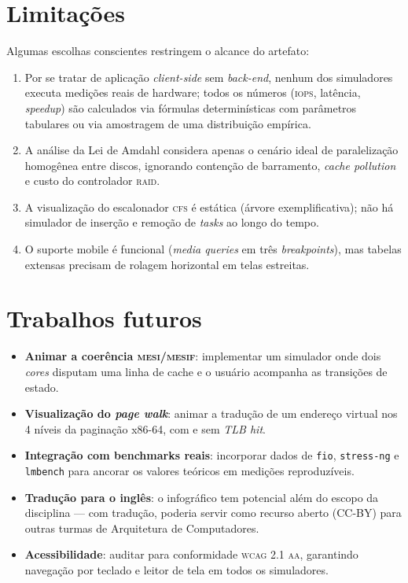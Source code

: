 \section{Limitações}

Algumas escolhas conscientes restringem o alcance do artefato:

\begin{enumerate}
    \item Por se tratar de aplicação \emph{client-side} sem
          \emph{back-end}, nenhum dos simuladores executa medições
          reais de hardware; todos os números (\textsc{iops},
          latência, \emph{speedup}) são calculados via fórmulas
          determinísticas com parâmetros tabulares ou via amostragem
          de uma distribuição empírica.
    \item A análise da Lei de Amdahl considera apenas o cenário
          ideal de paralelização homogênea entre discos, ignorando
          contenção de barramento, \emph{cache pollution} e custo
          do controlador \textsc{raid}.
    \item A visualização do escalonador \textsc{cfs} é estática
          (árvore exemplificativa); não há simulador de inserção e
          remoção de \emph{tasks} ao longo do tempo.
    \item O suporte mobile é funcional (\emph{media queries} em três
          \emph{breakpoints}), mas tabelas extensas precisam de
          rolagem horizontal em telas estreitas.
\end{enumerate}

\section{Trabalhos futuros}

\begin{itemize}
    \item \textbf{Animar a coerência \textsc{mesi/mesif}}: implementar
          um simulador onde dois \emph{cores} disputam uma linha de
          cache e o usuário acompanha as transições de estado.
    \item \textbf{Visualização do \emph{page walk}}: animar a
          tradução de um endereço virtual nos 4 níveis da
          paginação x86-64, com e sem \textit{TLB hit}.
    \item \textbf{Integração com benchmarks reais}: incorporar
          dados de \texttt{fio}, \texttt{stress-ng} e
          \texttt{lmbench} para ancorar os valores teóricos em
          medições reproduzíveis.
    \item \textbf{Tradução para o inglês}: o infográfico tem
          potencial além do escopo da disciplina --- com tradução,
          poderia servir como recurso aberto (CC-BY) para outras
          turmas de Arquitetura de Computadores.
    \item \textbf{Acessibilidade}: auditar para conformidade
          \textsc{wcag} 2.1 \textsc{aa}, garantindo navegação por
          teclado e leitor de tela em todos os simuladores.
\end{itemize}


